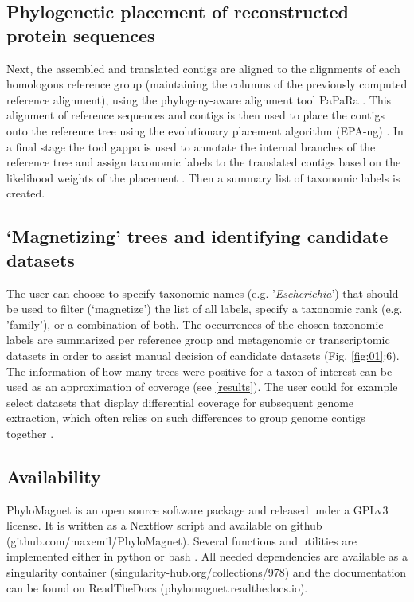 \documentclass[a4paper]{article}
\begin{document}
\subsection{Phylogenetic placement of reconstructed protein sequences}
Next, the assembled and translated contigs are aligned to the alignments of each homologous reference group (maintaining the columns of the previously computed reference alignment), using the phylogeny-aware alignment tool PaPaRa \citep[Fig. \ref{fig:01}:4;][]{Berger2011a}. This alignment of reference sequences and contigs is then used to place the contigs onto the reference tree using the evolutionary placement algorithm (EPA-ng) \citep[Fig. \ref{fig:01}:5;][]{Berger2011b,Barbera2019}. In a final stage the tool gappa is used to annotate the internal branches of the reference tree and assign taxonomic labels to the translated contigs based on the likelihood weights of the placement \citep{Czech2019}. Then a summary list of taxonomic labels is created.

\subsection{‘Magnetizing’ trees and identifying candidate datasets}
The user can choose to specify taxonomic names (e.g. '\textit{Escherichia}') that should be used to filter (‘magnetize’) the list of all labels, specify a taxonomic rank (e.g. 'family'), or a combination of both. The occurrences of the chosen taxonomic labels are summarized per reference group and metagenomic or transcriptomic datasets  in order to assist manual decision of candidate datasets (Fig. \ref{fig:01}:6). The information of how many trees were positive for a taxon of interest can be used as an approximation of coverage (see \ref{results}). The user could for example select datasets that display differential coverage for subsequent genome extraction, which often relies on such differences to group genome contigs together \citep{Albertsen2013,Alneberg2014}. 

\subsection{Availability}
PhyloMagnet is an open source software package and released under a GPLv3 license. It is written as a Nextflow \citep{DiTommaso2017} script and available on github (github.com/maxemil/PhyloMagnet). Several functions and utilities are implemented either in python or bash \citep{Dalke2009,Mckinney2010,Huerta-cepas2016a}. All needed dependencies are available as a singularity \citep{Kurtzer2017} container (singularity-hub.org/collections/978) and the documentation can be found on ReadTheDocs (phylomagnet.readthedocs.io).
\end{document}

